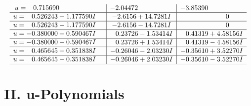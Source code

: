 \documentclass[1p]{elsarticle_modified}
\theoremstyle{definition}
\begin{document}
$$\begin{array}{c|c|c}
\begin{aligned}
u &= \phantom{-}0.715690\phantom{ +0.000000I}\end{aligned}
 & -2.04472\phantom{ +0.000000I} & -3.85390\phantom{ +0.000000I} \\ \hline\begin{aligned}
u &= \phantom{-}0.526243 + 1.177590 I\end{aligned}
 & -2.6156 + 14.7281 I & \phantom{-0.000000 } 0 \\ \hline\begin{aligned}
u &= \phantom{-}0.526243 - 1.177590 I\end{aligned}
 & -2.6156 - 14.7281 I & \phantom{-0.000000 } 0 \\ \hline\begin{aligned}
u &= -0.380000 + 0.590467 I\end{aligned}
 & \phantom{-}0.23726 - 1.53414 I & \phantom{-}0.41319 + 4.58156 I \\ \hline\begin{aligned}
u &= -0.380000 - 0.590467 I\end{aligned}
 & \phantom{-}0.23726 + 1.53414 I & \phantom{-}0.41319 - 4.58156 I \\ \hline\begin{aligned}
u &= \phantom{-}0.465645 + 0.351838 I\end{aligned}
 & -0.26046 - 2.03230 I & -0.35610 + 3.52270 I \\ \hline\begin{aligned}
u &= \phantom{-}0.465645 - 0.351838 I\end{aligned}
 & -0.26046 + 2.03230 I & -0.35610 - 3.52270 I\\
 \hline 
 \end{array}$$\newpage
\newpage\renewcommand{\arraystretch}{1}
\centering \section*{ II. u-Polynomials}
\end{document}

